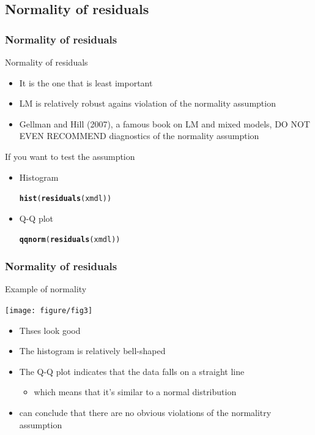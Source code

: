 \documentclass{beamer}\usepackage[]{graphicx}\usepackage[]{color}
\makeatletter
\newcommand{\hlstd}[1]{\textcolor[rgb]{0.345,0.345,0.345}{#1}}%
\newcommand{\hlkwd}[1]{\textcolor[rgb]{0.737,0.353,0.396}{\textbf{#1}}}%
\newenvironment{kframe}{%
 \def\at@end@of@kframe{}%
 \ifinner\ifhmode%
  \def\at@end@of@kframe{\end{minipage}}%
  \begin{minipage}{\columnwidth}%
 \fi\fi%
 \def\FrameCommand##1{\hskip\@totalleftmargin \hskip-\fboxsep
 \colorbox{shadecolor}{##1}\hskip-\fboxsep
     \hskip-\linewidth \hskip-\@totalleftmargin \hskip\columnwidth}%
 \MakeFramed {\advance\hsize-\width
   \@totalleftmargin\z@ \linewidth\hsize
   \@setminipage}}%
 {\par\unskip\endMakeFramed%
 \at@end@of@kframe}
\newenvironment{knitrout}{}{} %
\makeatother
\begin{document}
\subsection{Normality of residuals}
\begin{frame}
\frametitle{Normality of residuals}
Normality of residuals
\begin{itemize}
\item It is the one that is \alert{least important}
\item LM is relatively robust agains violation of the normality assumption
\item Gellman and Hill (2007), a famous book on LM and mixed models, DO NOT EVEN RECOMMEND diagnostics of the normality assumption
\end{itemize}

If you want to test the assumption
\begin{itemize}
\item Histogram
\begin{knitrout}\scriptsize
{}\color{fgcolor}\begin{kframe}
\begin{alltt}
\hlkwd{hist}\hlstd{(}\hlkwd{residuals}\hlstd{(xmdl))}
\end{alltt}
\end{kframe}
\end{knitrout}
\item Q-Q plot
\begin{knitrout}\scriptsize
{}\color{fgcolor}\begin{kframe}
\begin{alltt}
\hlkwd{qqnorm}\hlstd{(}\hlkwd{residuals}\hlstd{(xmdl))}
\end{alltt}
\end{kframe}
\end{knitrout}
\end{itemize}
\end{frame}

\begin{frame}
\frametitle{Normality of residuals}
Example of normality
\begin{center}
\texttt{[image: figure/fig3]}
\end{center}
\begin{itemize}
\item Thses look good
\item The histogram is relatively bell-shaped
\item The Q-Q plot indicates that the data falls on a straight line
	\begin{itemize}
	\item which means that it's similar to a normal distribution
	\end{itemize}
\item can conclude that there are no obvious violations of the normalitry assumption
\end{itemize}
\end{frame}
\end{document}
